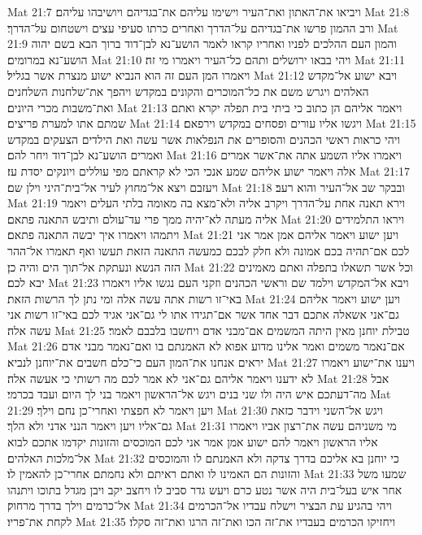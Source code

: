 Mat 21:7  ויביאו את־האתון ואת־העיר וישימו עליהם את־בגדיהם ויושיבהו עליהם׃
Mat 21:8  ורב ההמון פרשו את־בגדיהם על־הדרך ואחרים כרתו סעיפי עצים וישטחום על־הדרך׃
Mat 21:9  והמון העם ההלכים לפניו ואחריו קראו לאמר הושע־נא לבן־דוד ברוך הבא בשם יהוה הושע־נא במרומים׃
Mat 21:10  ויהי בבאו ירושלים ותהם כל־העיר ויאמרו מי זה׃
Mat 21:11  ויאמרו המן העם זה הוא הנביא ישוע מנצרת אשר בגליל׃
Mat 21:12  ויבא ישוע אל־מקדש האלהים ויגרש משם את כל־המוכרים והקונים במקדש ויהפך את־שלחנות השלחנים ואת־משבות מכרי היונים׃
Mat 21:13  ויאמר אליהם הן כתוב כי ביתי בית תפלה יקרא ואתם שמתם אתו למערת פריצים׃
Mat 21:14  ויגשו אליו עורים ופסחים במקדש וירפאם׃
Mat 21:15  ויהי כראות ראשי הכהנים והסופרים את הנפלאות אשר עשה ואת הילדים הצעקים במקדש ואמרים הושע־נא לבן־דוד ויחר להם׃
Mat 21:16  ויאמרו אליו השמע אתה את־אשר אמרים אלה ויאמר ישוע אליהם שמע אנכי הכי לא קראתם מפי עוללים ויונקים יסדת עז׃
Mat 21:17  ויעזבם ויצא אל־מחוץ לעיר אל־בית־היני וילן שם׃
Mat 21:18  ובבקר שב אל־העיר והוא רעב׃
Mat 21:19  וירא תאנה אחת על־הדרך ויקרב אליה ולא־מצא בה מאומה בלתי העלים ויאמר אליה מעתה לא־יהיה ממך פרי עד־עולם ותיבש התאנה פתאם׃
Mat 21:20  ויראו התלמידים ויתמהו ויאמרו איך יבשה התאנה פתאם׃
Mat 21:21  ויען ישוע ויאמר אליהם אמן אמר אני לכם אם־תהיה בכם אמונה ולא חלק לבכם כמעשה התאנה הזאת תעשו ואף תאמרו אל־ההר הזה הנשא ונעתקת אל־תוך הים והיה כן׃
Mat 21:22  וכל אשר תשאלו בתפלה ואתם מאמינים יבא לכם׃
Mat 21:23  ויבא אל־המקדש וילמד שם וראשי הכהנים וזקני העם נגשו אליו ויאמרו באי־זו רשות אתה עשה אלה ומי נתן לך הרשות הזאת׃
Mat 21:24  ויען ישוע ויאמר אליהם גם־אני אשאלה אתכם דבר אחד אשר אם־תגידו אתו לי גם־אני אגיד לכם באי־זו רשות אני עשה אלה׃
Mat 21:25  טבילת יוחנן מאין היתה המשמים אם־מבני אדם ויחשבו בלבבם לאמר׃
Mat 21:26  אם־נאמר משמים ואמר אלינו מדוע אפוא לא האמנתם בו ואם־נאמר מבני אדם יראים אנחנו את־המון העם כי־כלם חשבים את־יוחנן לנביא׃
Mat 21:27  ויענו את־ישוע ויאמרו לא ידענו ויאמר אליהם גם־אני לא אמר לכם מה רשותי כי אעשה אלה׃
Mat 21:28  אבל מה־דעתכם איש היה ולו שני בנים ויגש אל־הראשון ויאמר בני לך היום ועבד בכרמי׃
Mat 21:29  ויען ויאמר לא חפצתי ואחרי־כן נחם וילך׃
Mat 21:30  ויגש אל־השני וידבר כזאת גם־אליו ויען ויאמר הנני אדני ולא הלך׃
Mat 21:31  מי משניהם עשה את־רצון אביו ויאמרו אליו הראשון ויאמר להם ישוע אמן אמר אני לכם המוכסים והזונות יקדמו אתכם לבוא אל־מלכות האלהים׃
Mat 21:32  כי יוחנן בא אליכם בדרך צדקה ולא האמנתם לו והמוכסים והזונות הם האמינו לו ואתם ראיתם ולא נחמתם אחרי־כן להאמין לו׃
Mat 21:33  שמעו משל אחר איש בעל־בית היה אשר נטע כרם ויעש גדר סביב לו ויחצב יקב ויבן מגדל בתוכו ויתנהו אל־כרמים וילך בדרך מרחוק׃
Mat 21:34  ויהי בהגיע עת הבציר וישלח עבדיו אל־הכרמים לקחת את־פריו׃
Mat 21:35  ויחזיקו הכרמים בעבדיו את־זה הכו ואת־זה הרגו ואת־זה סקלו׃
